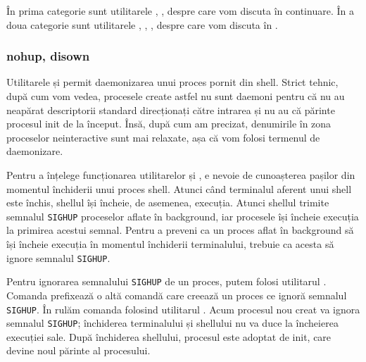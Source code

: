 În prima categorie sunt utilitarele , , despre care vom discuta în continuare.
În a doua categorie sunt utilitarele , , ,  despre care vom discuta în .

\subsubsection{nohup, disown}
\label{sec:process:nohup-disown}

Utilitarele  și  permit daemonizarea unui proces pornit din shell.
Strict tehnic, după cum vom vedea, procesele create astfel nu sunt daemoni pentru că nu au neapărat descriptorii standard direcționați către intrarea  și nu au că părinte procesul init de la început.
Însă, după cum am precizat, denumirile în zona proceselor neinteractive sunt mai relaxate, așa că vom folosi termenul de daemonizare.

Pentru a înțelege funcționarea utilitarelor  și , e nevoie de cunoașterea pașilor din momentul închiderii unui proces shell.
Atunci când terminalul aferent unui shell este închis, shellul își încheie, de asemenea, execuția.
Atunci shellul trimite semnalul \texttt{SIGHUP} proceselor aflate în background, iar procesele își încheie execuția la primirea acestui semnal.
Pentru a preveni ca un proces aflat în background să își încheie execuția în momentul închiderii terminalului, trebuie ca acesta să ignore semnalul \texttt{SIGHUP}.

Pentru ignorarea semnalului \texttt{SIGHUP} de un proces, putem folosi utilitarul .
Comanda  prefixează o altă comandă care creează un proces ce ignoră semnalul \texttt{SIGHUP}.
În  rulăm comanda  folosind utilitarul .
Acum procesul  nou creat va ignora semnalul \texttt{SIGHUP};
închiderea terminalului și shellului nu va duce la încheierea execuției sale.
După închiderea shellului, procesul este adoptat de init, care devine noul părinte al procesului.


